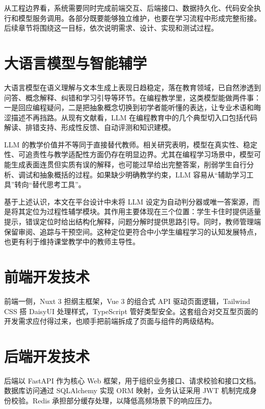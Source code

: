 从工程边界看，系统需要同时完成前端交互、后端接口、数据持久化、代码安全执行和模型服务调用。各部分既要能够独立维护，也要在学习流程中形成完整衔接。后续章节将围绕这一目标，依次说明需求、设计、实现和测试过程。

\section{大语言模型与智能辅学}
大语言模型在语义理解与文本生成上表现日趋稳定，落在教育领域，已自然渗透到问答、概念解释、纠错和学习引导等环节\cite{wang2024llmedu,raihan2025cseduslr}。在编程教学里，这类模型能做两件事：一是回应编程疑问，二是把抽象概念切换到初学者能听懂的表达，让专业术语和晦涩描述不再挡路。从现有文献看，LLM 在编程教育中的几个典型切入口包括代码解读、排错支持、形成性反馈、自动评测和知识建模\cite{raihan2025cseduslr,pitts2025llmprogedu}。

LLM 的教学价值并不等同于直接替代教师。相关研究表明，模型在真实性、稳定性、可追责性与教学适配性方面仍存在明显边界\cite{pirzado2024pitfalls,humble2024risk,tlili2023devilangel}。尤其在编程学习场景中，模型可能生成表面连贯但实质有误的解释，也可能过早给出完整答案，削弱学生自行分析、调试和抽象概括的过程\cite{pirzado2024pitfalls,gonzalez2025k12gpt}。如果缺少明确教学约束，LLM 容易从“辅助学习工具”转向“替代思考工具”。

基于上述认识，本文在平台设计中未将 LLM 设定为自动判分器或唯一答案源，而是将其定位为过程性辅学模块。其作用主要体现在三个位置：学生卡住时提供适量提示，错误定位时给出结构化解释，问题分解时提供思路引导。同时，教师管理端保留审阅、追踪与干预空间\cite{ma2024teachableagent,tang2025middleschool}。这种定位更符合中小学生编程学习的认知发展特点，也更有利于维持课堂教学中的教师主导性。

\section{前端开发技术}
前端一侧，Nuxt 3 担纲主框架，Vue 3 的组合式 API 驱动页面逻辑，Tailwind CSS 搭 DaisyUI 处理样式，TypeScript 管好类型安全。这套组合对交互型页面的开发需求应付得过来，也顺手把前端拆成了页面与组件的两级结构。

\section{后端开发技术}
后端以 FastAPI 作为核心 Web 框架，用于组织业务接口、请求校验和接口文档。数据库访问通过 SQLAlchemy 实现 ORM 映射，业务认证采用 JWT 机制完成身份校验。Redis 承担部分缓存处理，以降低高频场景下的响应压力。

